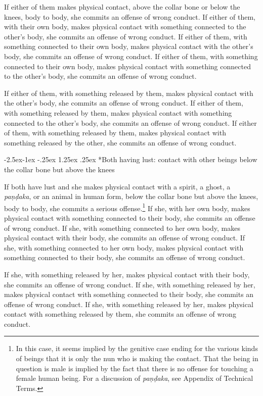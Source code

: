 \documentclass[12pt,openany]{book}%
\makeatletter
\renewcommand\subparagraph{\@startsection{subparagraph}{5}{\z@}%
            {-2.5ex\@plus -1ex \@minus -.25ex}%
            {1.25ex \@plus .25ex}%
            {\noindent\normalfont\itshape\footnotesize}}
\makeatother
\begin{document}
If either of them makes physical contact, above the collar bone or below the knees, body to body, she commits an offense of wrong conduct. If either of them, with their own body, makes physical contact with something connected to the other’s body, she commits an offense of wrong conduct. If either of them, with something connected to their own body, makes physical contact with the other’s body, she commits an offense of wrong conduct. If either of them, with something connected to their own body, makes physical contact with something connected to the other’s body, she commits an offense of wrong conduct. 

If either of them, with something released by them, makes physical contact with the other’s body, she commits an offense of wrong conduct. If either of them, with something released by them, makes physical contact with something connected to the other’s body, she commits an offense of wrong conduct. If either of them, with something released by them, makes physical contact with something released by the other, she commits an offense of wrong conduct. 

\subparagraph*{Both having lust: contact with other beings below the collar bone but above the knees }

If both have lust and she makes physical contact with a spirit, a ghost, a \textit{\textsanskrit{paṇḍaka}}, or an animal in human form, below the collar bone but above the knees, body to body, she commits a serious offense.\footnote{In this case, it seems implied by the genitive case ending for the various kinds of beings that it is only the nun who is making the contact. That the being in question is male is implied by the fact that there is no offense for touching a female human being. For a discussion of \textit{\textsanskrit{paṇḍaka}}, see Appendix of Technical Terms. } If she, with her own body, makes physical contact with something connected to their body, she commits an offense of wrong conduct. If she, with something connected to her own body, makes physical contact with their body, she commits an offense of wrong conduct. If she, with something connected to her own body, makes physical contact with something connected to their body, she commits an offense of wrong conduct. 

If she, with something released by her, makes physical contact with their body, she commits an offense of wrong conduct. If she, with something released by her, makes physical contact with something connected to their body, she commits an offense of wrong conduct. If she, with something released by her, makes physical contact with something released by them, she commits an offense of wrong conduct. 
\end{document}

